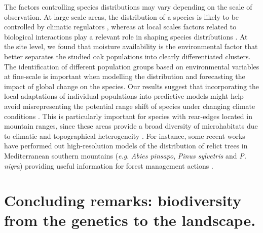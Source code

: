 The factors controlling species distributions may vary depending on the scale of observation. At large scale areas, the distribution of a species is likely to be controlled by climatic regulators \autocite{GuisanThuiller2005PredictingSpecies}, whereas at local scales factors related to biological interactions play a relevant role in shaping species distributions \autocite{Urbietaetal2008SoilWater,SanchezdeDiosetal2009PresentFuture}. At the site level, we found that moisture availability is the environmental factor that better separates the studied oak populations into clearly differentiated clusters. The identification of different population groups based on environmental variables at fine-scale is important when modelling the distribution and forecasting the impact of global change on the species. Our results suggest that incorporating the local adaptations of individual populations into predictive models might help avoid misrepresenting the potential range shift of species under changing climate conditions \autocite{BenitoGarzonetal2011IntraspecificVariability}. This is particularly important for species with rear-edges located in mountain ranges, since these areas provide a broad diversity of microhabitats due to climatic and topographical heterogeneity \autocite{MedailDiadema2009GlacialRefugia}.
For instance, some recent works have performed out high-resolution models of the distribution of relict trees in Mediterranean southern mountains (\emph{e.g}. \emph{Abies pinsapo}, \emph{Pinus sylvetris} and \emph{P. nigra}) providing useful information for forest management actions \autocite{LopezTiradoHidalgo2014HighResolution}.

\section{Concluding remarks: biodiversity from the genetics to the landscape.}\label{sec:multivar:Conclusion}

